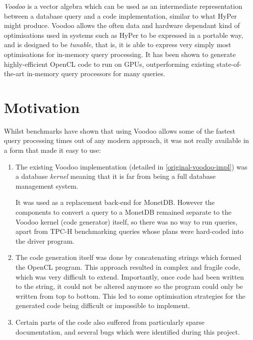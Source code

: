 \emph{Voodoo} \cite{Pirk:2016:VVA:3007328.3007336} is a vector algebra which can be used as an intermediate representation between a database query and a code implementation, similar to what HyPer might produce. Voodoo allows the often data and hardware dependant kind of optimisations used in systems such as HyPer to be expressed in a portable way, and is designed to be \emph{tunable}, that is, it is able to express very simply most optimisations for in-memory query processing. It has been shown to generate highly-efficient OpenCL code to run on GPUs, outperforming existing state-of-the-art in-memory query processors for many queries.

\section{Motivation}


Whilst benchmarks have shown that using Voodoo allows some of the fastest query processing times out of any modern approach, it was not really available in a form that made it easy to use:

\begin{enumerate}
    \item The existing Voodoo implementation (detailed in \ref{original-voodoo-impl}) was a database \emph{kernel} meaning that it is far from being a full database management system.
    
    It was used as a replacement back-end for MonetDB. However the components to convert a query to a MonetDB remained separate to the Voodoo kernel (code generator) itself, so there was no way to run queries, apart from TPC-H benchmarking queries whose plans were hard-coded into the driver program.
    \item The code generation itself was done by concatenating strings which formed the OpenCL program. This approach resulted in complex and fragile code, which was very difficult to extend. Importantly, once code had been written to the string, it could not be altered anymore so the program could only be written from top to bottom. This led to some optimisation strategies for the generated code being difficult or impossible to implement. 
    \item Certain parts of the code also suffered from particularly sparse documentation, and several bugs which were identified during this project.
\end{enumerate}

